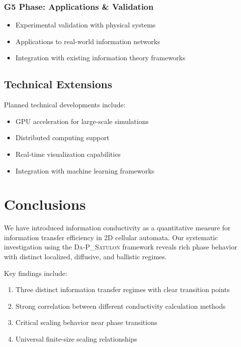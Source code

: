 \documentclass[twocolumn,showpacs,preprintnumbers,amsmath,amssymb,prb]{revtex4-2}
\newcommand{\satulon}{\textsc{Da-P\_Satulon}}
\begin{document}
\subsubsection{G5 Phase: Applications \& Validation}
\begin{itemize}
\item Experimental validation with physical systems
\item Applications to real-world information networks
\item Integration with existing information theory frameworks
\end{itemize}

\subsection{Technical Extensions}
\label{sec:technical}

Planned technical developments include:
\begin{itemize}
\item GPU acceleration for large-scale simulations
\item Distributed computing support
\item Real-time visualization capabilities
\item Integration with machine learning frameworks
\end{itemize}

\section{Conclusions}
\label{sec:conclusions}

We have introduced information conductivity as a quantitative measure for information transfer efficiency in 2D cellular automata. Our systematic investigation using the \satulon{} framework reveals rich phase behavior with distinct localized, diffusive, and ballistic regimes.

Key findings include:
\begin{enumerate}
\item Three distinct information transfer regimes with clear transition points
\item Strong correlation between different conductivity calculation methods
\item Critical scaling behavior near phase transitions
\item Universal finite-size scaling relationships
\end{enumerate}
\end{document}
